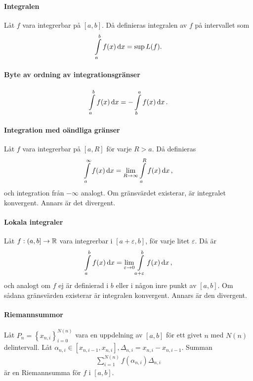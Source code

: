 \paragraph{Integralen}
Låt $f$ vara integrerbar på $[a, b]$. Då definieras integralen av $f$ på intervallet som
\begin{align*}
	\int\limits_{a}^{b}f(x)\dd{x} = \sup{L(f)}.
\end{align*}

\paragraph{Byte av ordning av integrationsgränser}
\begin{align*}
	\int\limits_{a}^{b}f(x)\dd{x} = -\int\limits_{b}^{a}f(x)\dd{x}.
\end{align*}

\paragraph{Integration med oändliga gränser}
Låt $f$ vara integrerbar på $[a, R]$ för varje $R > a$. Då definieras
\begin{align*}
	\int\limits_{a}^{\infty}f(x)\dd{x} = \lim\limits_{R\to \infty}\int\limits_{a}^{R}f(x)\dd{x},
\end{align*}
och integration från $-\infty$ analogt. Om gränsvärdet existerar, är integralet konvergent. Annars är det divergent.

\paragraph{Lokala integraler}
Låt $f: (a, b]\to\mathbb{R}$ vara integrerbar i $[a + \varepsilon, b]$, för varje litet $\varepsilon$. Då är
\begin{align*}
	\int\limits_{a}^{b}f(x)\dd{x} = \lim\limits_{\varepsilon\to 0}\int\limits_{a + \varepsilon}^{b}f(x)\dd{x},
\end{align*}
och analogt om $f$ ej är definierad i $b$ eller i någon inre punkt av $[a, b]$. Om sådana gränsvärden existerar är integralen konvergent. Annars är den divergent.

\paragraph{Riemannsummor}
Låt $P_n = \left\{x_{n, i}\right\}_{i = 0}^{N(n)}$ vara en uppdelning av $[a, b]$ för ett givet $n$ med $N(n)$ delintervall. Låt $\alpha_{n, i}\in [x_{n, i - 1}, x_{n, i}], \Delta_{n, i} = x_{n, i} - x_{n, i - 1}$. Summan
\begin{align*}
	\sum\limits_{i = 1}^{N(n)}f(\alpha_{n, i})\Delta_{n, i}
\end{align*}
är en Riemannsumma för $f$ i $[a, b]$.

